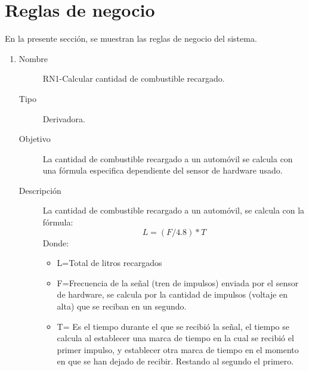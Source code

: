\section{Reglas de negocio}
En la presente sección, se muestran las reglas de negocio del sistema.
\begin{enumerate}[label=RN\arabic*.]
	\item \label{RN1}
		\begin{description}
			\item[Nombre] RN1-Calcular cantidad de combustible recargado.
			\item[Tipo] Derivadora.
			\item[Objetivo] La cantidad de combustible recargado a un automóvil se calcula con una fórmula especifica dependiente del sensor de hardware usado.
			\item[Descripción] La cantidad de combustible recargado a un automóvil, se calcula con la fórmula: $$L=(F/4.8)*T$$
			Donde:
				\begin{itemize}
					\item L=Total de litros recargados
					\item F=Frecuencia de la señal (tren de impulsos) enviada por el sensor de hardware, se calcula por la cantidad de impulsos (voltaje en alta) que se reciban en un segundo.
					\item T= Es el tiempo durante el que se recibió la señal, el tiempo se calcula al establecer una marca de tiempo en la cual se recibió el primer impulso, y establecer otra marca de tiempo en el momento en que se han dejado de recibir. Restando al segundo el primero.\cite{FS400A-G1}
				\end{itemize}
		\end{description}


\end{enumerate}
